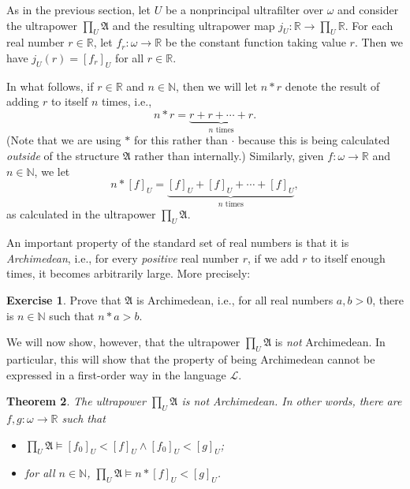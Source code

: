 \documentclass[a4paper]{memoir}
\newtheorem{theorem}{Theorem}[section]
\theoremstyle{definition}
\newtheorem{exercise}[theorem]{Exercise}
\newcommand{\bb}{\mathbb}
\newcommand{\mc}{\mathcal}
\newcommand{\ra}{\rightarrow}
\begin{document}
As in the previous section, let $U$ be a nonprincipal ultrafilter over $\omega$ and consider 
the ultrapower $\prod_U \mathfrak{A}$ and the resulting ultrapower map 
$j_U : \bb{R} \ra \prod_U \bb{R}$. For each real number $r \in \bb{R}$, let 
$f_r : \omega \ra \bb{R}$ be the constant function taking value $r$. Then we have 
$j_U(r) = [f_r]_U$ for all $r \in \bb{R}$.

In what follows, if $r \in \bb{R}$ and $n \in \bb{N}$, then we will let 
$n \ast r$ denote the result of adding $r$ to itself $n$ times, i.e., 
\[
  n \ast r = \underbrace{r + r + \cdots + r}_{\text{$n$ times}}.
\]
(Note that we are using $\ast$ for this rather than $\cdot$ because this is being calculated 
\emph{outside} of the structure $\mathfrak{A}$ rather than internally.) Similarly, 
given $f : \omega \ra \bb{R}$ and $n \in \bb{N}$, we let 
\[
  n \ast [f]_U = \underbrace{[f]_U + [f]_U + \cdots + [f]_U}_{\text{$n$ times}},
\]
as calculated in the ultrapower $\prod_U \mathfrak{A}$.

An important property of the standard set of real numbers is that it is \emph{Archimedean}, i.e., 
for every \emph{positive} real number $r$, if we add $r$ to itself enough times, it becomes 
arbitrarily large. More precisely:

\begin{exercise}
  Prove that $\mathfrak{A}$ is Archimedean, i.e., for all real numbers $a,b > 0$, there is 
  $n \in \bb{N}$ such that $n \ast a > b$.
\end{exercise}

We will now show, however, that the ultrapower $\prod_U \mathfrak{A}$ is \emph{not} 
Archimedean. In particular, this will show that the property of being Archimedean cannot be 
expressed in a first-order way in the language $\mc{L}$.

\begin{theorem}
  The ultrapower $\prod_U \mathfrak{A}$ is not Archimedean. In other words, there are 
  $f,g:\omega \ra \bb{R}$ such that
  \begin{itemize}
    \item $\prod_U \mathfrak{A} \models [f_0]_U < [f]_U \wedge [f_0]_U < [g]_U$;
    \item for all $n \in \bb{N}$, $\prod_U \mathfrak{A} \models n \ast [f]_U < [g]_U$.
  \end{itemize}
\end{theorem}
\end{document}
